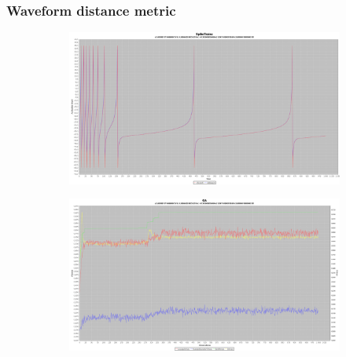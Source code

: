 \documentclass[10pt]{article}
\begin{document}
		\subsubsection{Waveform distance metric}
			\begin{figure}[H]
				\centering
					\begin{subfigure}{.5\textwidth}
						\centering
						\includegraphics[width=\linewidth]{./../images/izzy4/wave/plot.png}

						\label{fig:sub12a}
					\end{subfigure}%
					\begin{subfigure}{.5\textwidth}
						\centering
						\includegraphics[width=\linewidth]{./../images/izzy4/wave/prog.png}
						
						\label{fig:sub12b}
					\end{subfigure}
					
					\label{fig:plot12}
			\end{figure}
\end{document}
